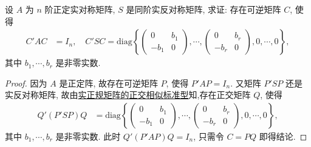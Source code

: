 \documentclass[../../main.tex]{subfiles}%
\begin{document}
\begin{proposition}[正定阵与实反称阵可同时合同对角化]\label{proposition:正定阵与实反称阵可同时合同对角化-例9.114}
设 $A$ 为 $n$ 阶正定实对称矩阵, $S$ 是同阶实反对称矩阵, 求证: 存在可逆矩阵 $C$, 使得
\begin{align*}
C'AC &= I_n,\quad C'SC = \mathrm{diag}\left\{\begin{pmatrix}0 & b_1\\ -b_1 & 0\end{pmatrix},\cdots,\begin{pmatrix}0 & b_r\\ -b_r & 0\end{pmatrix},0,\cdots,0\right\},
\end{align*}
其中 $b_1,\cdots,b_r$ 是非零实数.
\end{proposition}
\begin{proof}
因为 $A$ 是正定阵, 故存在可逆矩阵 $P$, 使得 $P'AP = I_n$. 又矩阵 $P'SP$ 还是实反对称矩阵, 故由\hyperref[theorem:实正规矩阵的正交相似标准型]{实正规矩阵的正交相似标准型}知,存在正交矩阵 $Q$, 使得
\begin{align*}
Q'(P'SP)Q &= \mathrm{diag}\left\{\begin{pmatrix}0 & b_1\\ -b_1 & 0\end{pmatrix},\cdots,\begin{pmatrix}0 & b_r\\ -b_r & 0\end{pmatrix},0,\cdots,0\right\},
\end{align*}
其中 $b_1,\cdots,b_r$ 是非零实数. 此时 $Q'(P'AP)Q = I_n$, 只需令 $C = PQ$ 即得结论.
\end{proof}
\end{document}
